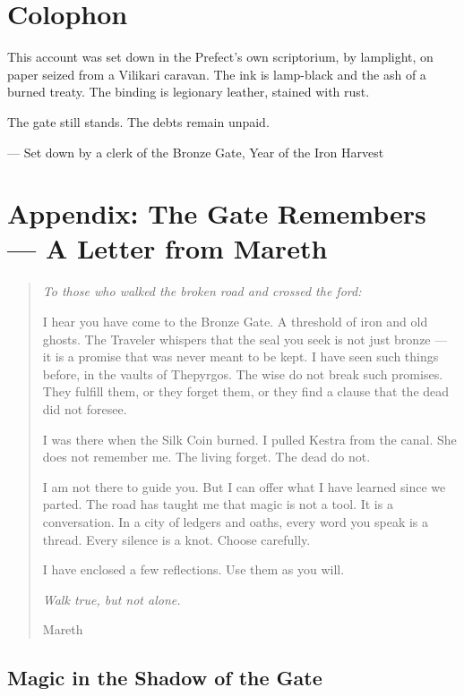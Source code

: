 \documentclass[10pt,twoside]{book}
\begin{document}
\chapter{Colophon}

This account was set down in the Prefect's own scriptorium, by lamplight, on paper seized from a Vilikari caravan. The ink is lamp-black and the ash of a burned treaty. The binding is legionary leather, stained with rust.

The gate still stands. The debts remain unpaid.

--- Set down by a clerk of the Bronze Gate, Year of the Iron Harvest

\chapter*{Appendix: The Gate Remembers --- A Letter from Mareth}

\begin{quote}\itshape
To those who walked the broken road and crossed the ford:

I hear you have come to the Bronze Gate. A threshold of iron and old ghosts. The Traveler whispers that the seal you seek is not just bronze --- it is a promise that was never meant to be kept. I have seen such things before, in the vaults of Thepyrgos. The wise do not break such promises. They fulfill them, or they forget them, or they find a clause that the dead did not foresee.

I was there when the Silk Coin burned. I pulled Kestra from the canal. She does not remember me. The living forget. The dead do not.

I am not there to guide you. But I can offer what I have learned since we parted. The road has taught me that magic is not a tool. It is a conversation. In a city of ledgers and oaths, every word you speak is a thread. Every silence is a knot. Choose carefully.

I have enclosed a few reflections. Use them as you will.

\textit{Walk true, but not alone.}

Mareth
\end{quote}

\section*{Magic in the Shadow of the Gate}
\end{document}
